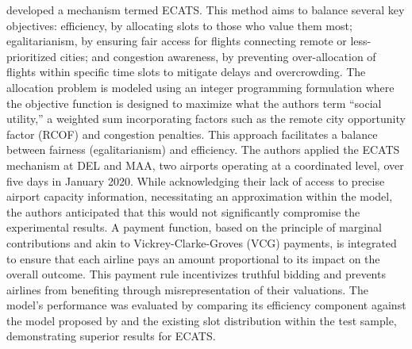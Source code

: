  developed a mechanism termed
\acrfull{ECATS}.
%
This method aims to balance several key objectives: efficiency, by allocating
slots to those who value them most; egalitarianism, by ensuring fair access for
flights connecting remote or less-prioritized cities; and congestion awareness,
by preventing over-allocation of flights within specific time slots to mitigate
delays and overcrowding.
%
The allocation problem is modeled using an integer programming formulation where
the objective function is designed to maximize what the authors term “social
utility,” a weighted sum incorporating factors such as the remote city
opportunity factor (RCOF) and congestion penalties.
%
This approach facilitates a balance between fairness (egalitarianism) and
efficiency.
%
The authors applied the ECATS mechanism at \acrlong{DEL} and \acrlong{MAA}, two
airports operating at a coordinated level, over five days in January 2020.
%
While acknowledging their lack of access to precise airport capacity
information, necessitating an approximation within the model, the authors
anticipated that this would not significantly compromise the experimental
results.
%
A payment function, based on the principle of marginal contributions and akin to
Vickrey-Clarke-Groves (VCG) payments, is integrated to ensure that each airline
pays an amount proportional to its impact on the overall outcome.
%
This payment rule incentivizes truthful bidding and prevents airlines from
benefiting through misrepresentation of their valuations.
%
The model's performance was evaluated by comparing its efficiency component
against the model proposed by  and the
existing slot distribution within the test sample, demonstrating superior
results for \acrfull{ECATS}.



